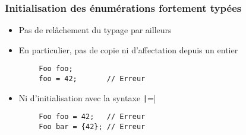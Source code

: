 \documentclass[C++.tex]{subfiles}
\begin{document}
\begin{frame}[fragile]
	\frametitle{Initialisation des énumérations fortement typées}
	\begin{itemize}
		\item Pas de relâchement du typage par ailleurs
		\item En particulier, pas de copie ni d'affectation depuis un entier
	\end{itemize}

	\begin{verbatim}
		Foo foo;
		foo = 42;       // Erreur
	\end{verbatim}

	\begin{itemize}
		\item Ni d'initialisation avec la syntaxe \texttt|=|
	\end{itemize}

	\begin{verbatim}
		Foo foo = 42;   // Erreur
		Foo bar = {42}; // Erreur
	\end{verbatim}


\end{frame}
\end{document}
